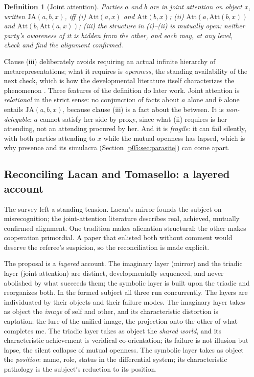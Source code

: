 \documentclass[11pt,a4paper]{article}
\theoremstyle{seriesthm}
\newtheorem{defn}{Definition}
\begin{document}
\begin{defn}[Joint attention]\label{p05:def:ja}
Parties $a$ and $b$ are in joint attention on object $x$, written $\mathrm{JA}(a,b,x)$, iff
(i) $\mathrm{Att}(a,x)$ and $\mathrm{Att}(b,x)$;
(ii) $\mathrm{Att}(a,\mathrm{Att}(b,x))$ and $\mathrm{Att}(b,\mathrm{Att}(a,x))$;
(iii) the structure in (i)--(ii) is mutually open: neither party's awareness of it is hidden from the other, and each may, at any level, check and find the alignment confirmed.
\end{defn}

Clause (iii) deliberately avoids requiring an actual infinite hierarchy of metarepresentations; what it requires is \emph{openness}, the standing availability of the next check, which is how the developmental literature itself characterizes the phenomenon \parencite{tomasello1995}. Three features of the definition do later work. Joint attention is \emph{relational} in the strict sense: no conjunction of facts about $a$ alone and $b$ alone entails $\mathrm{JA}(a,b,x)$, because clause (iii) is a fact about the between. It is \emph{non-delegable}: $a$ cannot satisfy her side by proxy, since what (ii) requires is her attending, not an attending procured by her. And it is \emph{fragile}: it can fail silently, with both parties attending to $x$ while the mutual openness has lapsed, which is why presence and its simulacra (Section \ref{p05:sec:parasite}) can come apart.

\subsection{Reconciling Lacan and Tomasello: a layered account}
\label{p05:sec:lacantomasello}

The survey left a standing tension. Lacan's mirror founds the subject on misrecognition; the joint-attention literature describes real, achieved, mutually confirmed alignment. One tradition makes alienation structural; the other makes cooperation primordial. A paper that enlisted both without comment would deserve the referee's suspicion, so the reconciliation is made explicit.

The proposal is a \emph{layered} account. The imaginary layer (mirror) and the triadic layer (joint attention) are distinct, developmentally sequenced, and never abolished by what succeeds them; the symbolic layer is built upon the triadic and reorganizes both. In the formed subject all three run concurrently. The layers are individuated by their objects and their failure modes. The imaginary layer takes as object the \emph{image} of self and other, and its characteristic distortion is captation: the lure of the unified image, the projection onto the other of what completes me. The triadic layer takes as object the \emph{shared world}, and its characteristic achievement is veridical co-orientation; its failure is not illusion but lapse, the silent collapse of mutual openness. The symbolic layer takes as object the \emph{position}: name, role, status in the differential system; its characteristic pathology is the subject's reduction to its position.
\end{document}
